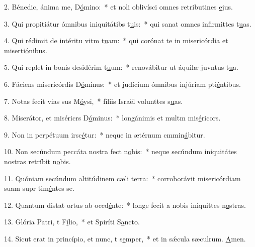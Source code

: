 2. Bénedic, ánima me, D\uline{ó}mino:~* et noli oblivísci omnes retributines \uline{e}jus.\par 
3. Qui propitiátur ómnibus iniquitátibs t\uline{u}is:~* qui sanat omnes infirmittes t\uline{u}as.\par 
4. Qui rédimit de intéritu vitm t\uline{u}am:~* qui corónat te in misericórdia et miserti\uline{ó}nibus.\par 
5. Qui replet in bonis desidérim t\uline{u}um:~* renovábitur ut áquilæ juvntus t\uline{u}a.\par 
6. Fáciens misericórdis D\uline{ó}minus:~* et judícium ómnibus injúriam pti\uline{é}ntibus.\par 
7. Notas fecit vias sus M\uline{ó}ysi,~* fíliis Israël volunttes s\uline{u}as.\par 
8. Miserátor, et miséricrs D\uline{ó}minus:~* longánimis et multm mis\uline{é}ricors.\par 
9. Non in perpétuum irsc\uline{é}tur:~* neque in ætérnum cmmin\uline{á}bitur.\par 
10. Non secúndum peccáta nostra fect n\uline{o}bis:~* neque secúndum iniquitátes nostras retríbit n\uline{o}bis.\par 
11. Quóniam secúndum altitúdinem cæli  t\uline{e}rra:~* corroborávit misericórdiam suam supr tim\uline{é}ntes se.\par 
12. Quantum distat ortus ab occd\uline{é}nte:~* longe fecit a nobis iniquittes n\uline{o}stras.\par 
13. Glória Patri, t F\uline{í}lio,~* et Spiríti S\uline{a}ncto.\par 
14. Sicut erat in princípio, et nunc, t s\uline{e}mper,~* et in sǽcula sæculrum. \uline{A}men.\par 
